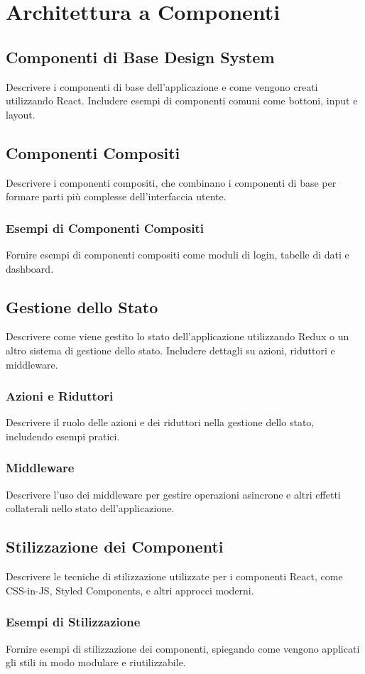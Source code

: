 \section{Architettura a Componenti}
\label{sec:architettura_componenti}

\subsection{Componenti di Base Design System}
Descrivere i componenti di base dell'applicazione e come vengono creati utilizzando React. Includere esempi di componenti comuni come bottoni, input e layout.

\subsection{Componenti Compositi}
Descrivere i componenti compositi, che combinano i componenti di base per formare parti più complesse dell'interfaccia utente.

\subsubsection*{Esempi di Componenti Compositi}
Fornire esempi di componenti compositi come moduli di login, tabelle di dati e dashboard.

\subsection{Gestione dello Stato}
Descrivere come viene gestito lo stato dell'applicazione utilizzando Redux o un altro sistema di gestione dello stato. Includere dettagli su azioni, riduttori e middleware.

\subsubsection*{Azioni e Riduttori}
Descrivere il ruolo delle azioni e dei riduttori nella gestione dello stato, includendo esempi pratici.

\subsubsection*{Middleware}
Descrivere l'uso dei middleware per gestire operazioni asincrone e altri effetti collaterali nello stato dell'applicazione.

\subsection{Stilizzazione dei Componenti}
Descrivere le tecniche di stilizzazione utilizzate per i componenti React, come CSS-in-JS, Styled Components, e altri approcci moderni.

\subsubsection*{Esempi di Stilizzazione}
Fornire esempi di stilizzazione dei componenti, spiegando come vengono applicati gli stili in modo modulare e riutilizzabile.

\newpage